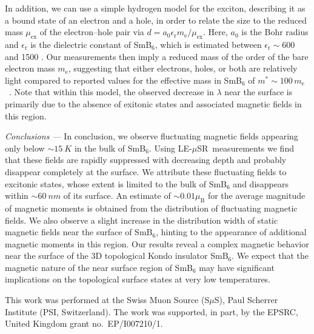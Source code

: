 \documentclass[10pt,aps,prb,twocolumn,showpacs,preprintnumbers,amsmath,amssymb,superscriptaddress,floatfix]{revtex4-1}
\newcommand{\msr}{$\mu$SR}
\newcommand{\lem}{LE-\msr}
\newcommand{\smb}{SmB$_6$}
\newcommand{\usim}{\sim \!}
\newcommand{\mysection}[1]{\smallskip\emph{#1 ---}\phantomsection}
\begin{document}
In addition, we can use a simple hydrogen model for the exciton,
describing it as a bound state of an electron and a hole, in order to
relate the size to the reduced mass $\mu_\mathrm{ex}$ of the
electron--hole pair via $d=a_0
\epsilon_{\mathrm{r}}m_\mathrm{e}/\mu_\mathrm{ex}$. Here, $a_0$ is the
Bohr radius and $\epsilon_\mathrm{r}$ is the dielectric constant of
\smb{}, which is estimated between $\epsilon_{\mathrm{r}} \sim 600$
\cite{Gorshunov1999prb} and 1500 \cite{Travaglini1984prb}. Our
measurements then imply a reduced mass of the order of the bare
electron mass $m_\mathrm{e}$, suggesting that either electrons, holes,
or both are relatively light compared to reported values for the
effective mass in \smb{} of $m^*\sim
100\,m_\mathrm{e}$~\cite{Gorshunov1999prb}. Note that within this
model, the observed decrease in $\lambda$ near the surface is
primarily due to the absence of exitonic states and associated
magnetic fields in this region.

\mysection{Conclusions}
%
In conclusion, we observe fluctuating magnetic fields appearing only
below $\usim\SI{15}{K}$ in the bulk of \smb{}. Using \lem\
measurements we find that these fields are rapidly suppressed with
decreasing depth and probably disappear completely at the surface. We
attribute these fluctuating fields to excitonic states, whose extent
is limited to the bulk of \smb{} and disappears within
$\usim\SI{60}{nm}$ of its surface. An estimate of $\usim
0.01\mu_\mathrm{B}$ for the average magnitude of magnetic moments is
obtained from the distribution of fluctuating magnetic fields. We also
observe a slight increase in the distribution width of static magnetic
fields near the surface of \smb{}, hinting to the appearance of
additional magnetic moments in this region. Our results reveal a
complex magnetic behavior near the surface of the 3D topological Kondo
insulator \smb{}. We expect that the magnetic nature of the near
surface region of \smb{} may have significant implications on the
topological surface states at very low temperatures.

This work was performed at the Swiss Muon Source (S$\mu$S), Paul
Scherrer Institute (PSI, Switzerland). The work was supported, in
part, by the EPSRC, United Kingdom grant no.\ EP/I007210/1.

%
\end{document}
